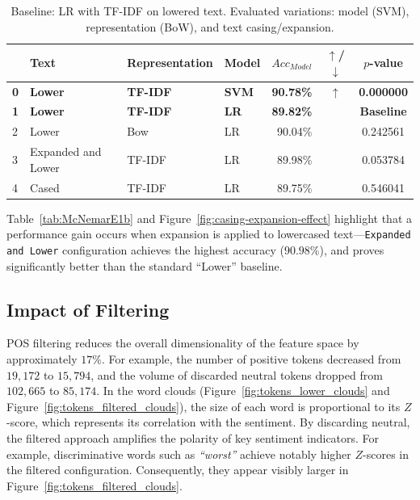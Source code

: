 \documentclass[a4paper,twoside,12pt]{book}
\newcommand{\zscore}{Z}
\newcommand{\logreg}{LR}
\newcommand{\mcnemarp}{p}
\newcommand{\literal}[1]{\textit{``#1''}}
\begin{document}
\begin{table}[tbp]
	\vspace{0.5em}
	
	\begin{subtable}{\textwidth}
		\centering
		\caption{Baseline: \logreg{} with TF-IDF on lowered text. Evaluated variations: model (SVM), representation (BoW), and text casing/expansion.}
		\label{tab:McNemarE1d}
		\begin{tabular}{llllrcc}
			\toprule
			& Text & Representation & Model & $Acc_{Model}$ & $\uparrow$/$\downarrow$ & $\mcnemarp$-value \\
			\midrule
			\textbf{0} & \textbf{Lower} & \textbf{TF-IDF} & \textbf{SVM} & \textbf{90.78\%} & \textbf{$\uparrow$} & \textbf{0.000000} \\
			\textbf{1} & \textbf{Lower} & \textbf{TF-IDF} & \textbf{\logreg{}} & \textbf{89.82\%} & \textbf{} & \textbf{Baseline} \\
			2 & Lower & Bow & \logreg{} & 90.04\% &  & 0.242561 \\
			3 & Expanded and Lower & TF-IDF & \logreg{} & 89.98\% &  & 0.053784 \\
			4 & Cased & TF-IDF & \logreg{} & 89.75\% &  & 0.546041 \\
			\bottomrule
		\end{tabular}
	\end{subtable}
\end{table}



Table~\ref{tab:McNemarE1b} and Figure~\ref{fig:casing-expansion-effect} highlight that a performance gain occurs when expansion is applied to lowercased text---\texttt{Expanded and Lower} configuration achieves the highest accuracy ($90.98\%$), and proves significantly better than the standard ``Lower'' baseline.
\subsection{Impact of Filtering}
\label{sec:Impact-of-Filtering}

POS filtering reduces the overall dimensionality of the feature space by approximately $17\%$. For example, the number of positive tokens decreased from $19{,}172$ to $15{,}794$, and the volume of discarded neutral tokens dropped from $102{,}665$ to $85{,}174$. In the word clouds (Figure~\ref{fig:tokens_lower_clouds} and Figure~\ref{fig:tokens_filtered_clouds}), the size of each word is proportional to its $\zscore$-score, which represents its correlation with the sentiment. By discarding neutral, the filtered approach amplifies the polarity of key sentiment indicators. For example, discriminative words such as \literal{worst} achieve notably higher $\zscore$-scores in the filtered configuration. Consequently, they appear visibly larger in Figure~\ref{fig:tokens_filtered_clouds}.
\end{document}
